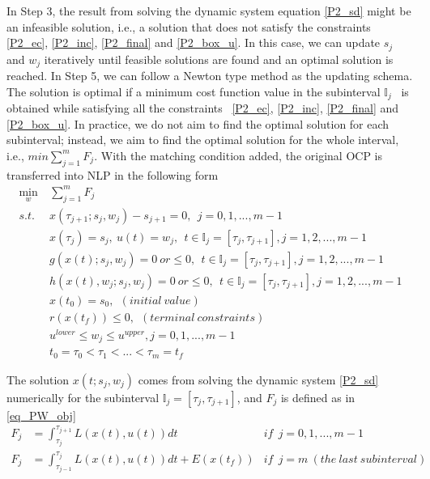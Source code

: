 \documentclass  [
  paper    = a4,
  BCOR     = 10mm,
  twoside,
  fontsize = 12pt,
  fleqn,
  toc      = bibnumbered,
  toc      = listofnumbered,
  numbers  = noendperiod,
  headings = normal,
  listof   = leveldown,
  version  = 3.03
]                                       {scrreprt}
\newcommand{\<}{\langle}
\renewcommand{\>}{\rangle}
\begin{document}
In Step 3, the result from solving the dynamic system equation \ref{P2_sd} might be an infeasible solution, i.e., a solution that does not satisfy the constraints \ref{P2_ec}, \ref{P2_inc}, \ref{P2_final} and \ref{P2_box_u}. In this case, we can update $s_j$ and $w_j$ iteratively until feasible solutions are found and an optimal solution is reached. In Step 5, we can follow a Newton type method as the updating schema. The solution is optimal if a minimum cost function value in the subinterval $\mathbb{I}_j$  is obtained while satisfying all the constraints  \ref{P2_ec}, \ref{P2_inc}, \ref{P2_final} and \ref{P2_box_u}. In practice, we do not aim to find the optimal solution for each subinterval; instead, we aim to find the optimal solution for the whole interval, i.e., $min  \sum_{j=1}^{m} F_j $. With the matching condition added, the original OCP is transferred into NLP in the following form
	\begin{subequations}
	\begin{align}
		\underset{w}{\text{min}}   \ &  \sum_{j=1}^{m} F_j   \label{P3_obj}   \\
		s.t. \ \ & x(\tau_{j+1}; s_j, w_j) - s_{j+1} = 0,   \ \  j = 0, 1, ...,m -1 \label{P3_eq}  \\
		& x(\tau_j) = s_j, \  u(t) = w_j, \ \  t \in \mathbb{I}_j =[\tau_j, \tau_{j+1}], j = 1, 2, ... , m-1 \\
		 &  g(x(t); s_j, w_j)  = 0 \  or \leq 0,     \ \  t \in \mathbb{I}_j =[\tau_j, \tau_{j+1}], j = 1, 2, ... , m-1 \\
		 & h(x(t),w_j; s_j, w_j) = 0 \  or \leq 0,    \ \  t \in \mathbb{I}_j =[\tau_j, \tau_{j+1}], j = 1, 2, ... , m-1   \\
    	& x(t_0) = s_0, \ \ (initial \ value) \\
	& r(x(t_f)) \leq 0, \ \ (terminal \ constraints) \\
	& u^{lower} \leq w_j \leq u^{upper} ,   j = 0, 1, ... , m-1 \\ 
		         &   t_0 = \tau_0 < \tau_1 < ... < \tau_m = t_f 
	\end{align}
	\label{P3_MSNLP}
\end{subequations}  

The  solution  $x(t; s_j, w_j)$ comes from solving the dynamic system \ref{P2_sd} numerically for the subinterval  $\mathbb{I}_j =[\tau_j, \tau_{j+1}]$,  and $F_j$ is defined as in \ref{eq_PW_obj}
\begin{equation}\label{eq_PW_obj}
	\begin{aligned}
		F_j &= \int_{\tau_{j}}^{\tau_{j+1}}L(x(t), u(t))dt   &if \ \   j= 0, 1, ..., m-1 \\ 
		F_j  & = \int_{\tau_{j-1}}^{\tau_j}L(x(t), u(t))dt + E (x(t_f)) &if\ \   j =m  \ (the\  last\  subinterval)
	\end{aligned}
\end{equation}
\end{document}
